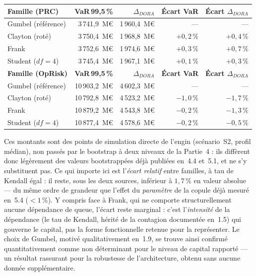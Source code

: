 \documentclass[11pt,a4paper]{article}
\theoremstyle{navystyle}
\theoremstyle{navydef}
\begin{document}
\begin{center}
\renewcommand{\arraystretch}{1.25}
\begin{tabular}{l r r r r}
\toprule
\rowcolor{lightblue}
\textbf{Famille (PRC)} & \textbf{VaR\,99,5\,\%} & \textbf{$\Delta_{DORA}$} & \textbf{Écart VaR} & \textbf{Écart $\Delta_{DORA}$} \\
\midrule
Gumbel (référence)     & 3\,741{,}9~M\euro  & 1\,960{,}4~M\euro & --- & --- \\
Clayton (roté)          & 3\,750{,}4~M\euro  & 1\,968{,}8~M\euro & $+0{,}2\,\%$ & $+0{,}4\,\%$ \\
Frank                   & 3\,752{,}6~M\euro  & 1\,974{,}6~M\euro & $+0{,}3\,\%$ & $+0{,}7\,\%$ \\
Student ($df=4$)        & 3\,745{,}4~M\euro  & 1\,967{,}1~M\euro & $+0{,}1\,\%$ & $+0{,}3\,\%$ \\
\midrule
\rowcolor{lightblue}
\textbf{Famille (OpRisk)} & \textbf{VaR\,99,5\,\%} & \textbf{$\Delta_{DORA}$} & \textbf{Écart VaR} & \textbf{Écart $\Delta_{DORA}$} \\
\midrule
Gumbel (référence)     & 10\,903{,}2~M\euro & 4\,602{,}3~M\euro & --- & --- \\
Clayton (roté)          & 10\,792{,}8~M\euro & 4\,523{,}2~M\euro & $-1{,}0\,\%$ & $-1{,}7\,\%$ \\
Frank                   & 10\,879{,}2~M\euro & 4\,543{,}8~M\euro & $-0{,}2\,\%$ & $-1{,}3\,\%$ \\
Student ($df=4$)        & 10\,877{,}4~M\euro & 4\,578{,}6~M\euro & $-0{,}2\,\%$ & $-0{,}5\,\%$ \\
\bottomrule
\end{tabular}
\end{center}

Ces montants sont des points de simulation directe de l'engin (scénario~S2,
profil médian), non passés par le bootstrap à deux niveaux de la Partie~4 :
ils diffèrent donc légèrement des valeurs bootstrappées déjà publiées en~4.4
et~5.1, et ne s'y substituent pas. Ce qui importe ici est l'\emph{écart
relatif} entre familles, à tau de Kendall égal : il reste, sous les deux
sources, inférieur à $1{,}7\,\%$ en valeur absolue --- du même ordre de
grandeur que l'effet du \emph{paramètre} de la copule déjà mesuré en~5.4
($<1\,\%$). Y compris face à Frank, qui ne comporte structurellement aucune
dépendance de queue, l'écart reste marginal : c'est l'\emph{intensité} de la
dépendance (le tau de Kendall, hérité de la contagion documentée en~1.5) qui
gouverne le capital, pas la forme fonctionnelle retenue pour la représenter.
Le choix de Gumbel, motivé qualitativement en~1.9, se trouve ainsi confirmé
quantitativement comme non déterminant pour le niveau de capital rapporté ---
un résultat rassurant pour la robustesse de l'architecture, obtenu sans
aucune donnée supplémentaire.
\end{document}
